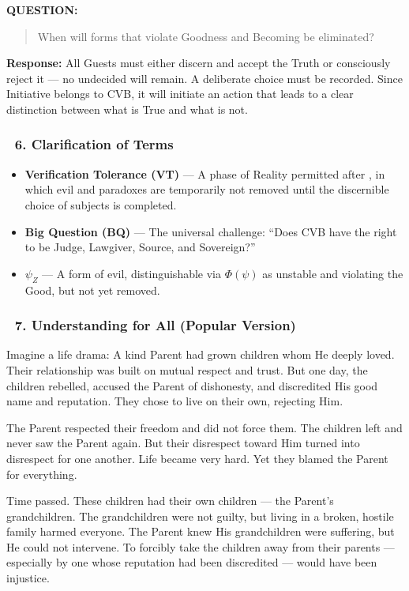 \documentclass[12pt]{article}
\begin{document}
\textbf{QUESTION:}  
\begin{quote}
When will forms that violate Goodness and Becoming be eliminated?
\end{quote}
\textbf{Response:} All Guests must either discern and accept the Truth or consciously reject it — no undecided will remain. A deliberate choice must be recorded. Since Initiative belongs to CVB, it will initiate an action that leads to a clear distinction between what is True and what is not.

\subsubsection*{🔹 6. Clarification of Terms}

\begin{itemize}
\item \textbf{Verification Tolerance (VT)} — A phase of Reality permitted after \text{[25]}, in which evil and paradoxes are temporarily not removed until the discernible choice of subjects is completed.

\item \textbf{Big Question (BQ)} — The universal challenge: ``Does CVB have the right to be Judge, Lawgiver, Source, and Sovereign?''

\item $\psi_Z$ — A form of evil, distinguishable via $\Phi(\psi)$ as unstable and violating the Good, but not yet removed.
\end{itemize}

\subsubsection*{🔹 7. Understanding for All (Popular Version)}

Imagine a life drama: A kind Parent had grown children whom He deeply loved. Their relationship was built on mutual respect and trust. But one day, the children rebelled, accused the Parent of dishonesty, and discredited His good name and reputation. They chose to live on their own, rejecting Him.

The Parent respected their freedom and did not force them. The children left and never saw the Parent again. But their disrespect toward Him turned into disrespect for one another. Life became very hard. Yet they blamed the Parent for everything.

Time passed. These children had their own children — the Parent’s grandchildren. The grandchildren were not guilty, but living in a broken, hostile family harmed everyone. The Parent knew His grandchildren were suffering, but He could not intervene. To forcibly take the children away from their parents — especially by one whose reputation had been discredited — would have been injustice.
\end{document}

